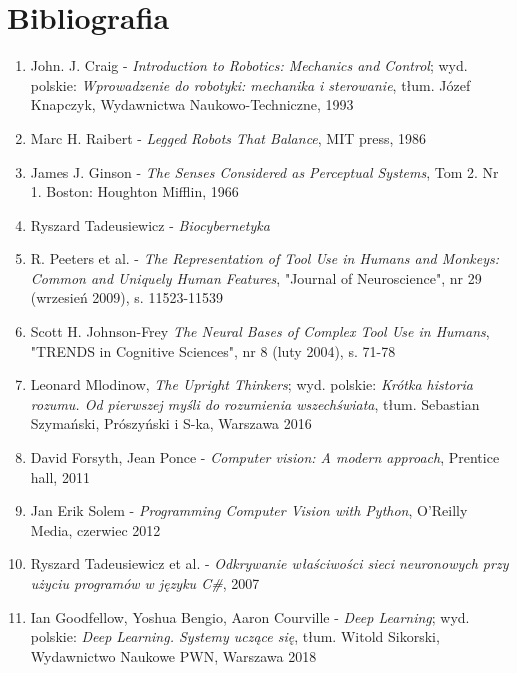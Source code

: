 \documentclass{article}
\begin{document}
\section*{\LARGE{Bibliografia}} 
\begin{enumerate}
\item John. J. Craig - \emph{Introduction to Robotics: Mechanics and Control}; wyd. polskie: \emph{Wprowadzenie do robotyki: mechanika i sterowanie}, tłum. Józef Knapczyk, Wydawnictwa Naukowo-Techniczne, 1993

\item Marc H. Raibert - \emph{Legged Robots That Balance}, MIT press, 1986

\item James J. Ginson - \emph{The Senses Considered as Perceptual Systems}, Tom 2. Nr 1. Boston: Houghton Mifflin, 1966

\item Ryszard Tadeusiewicz - \emph{Biocybernetyka}

\item R. Peeters et al. - \emph{The Representation of Tool Use in Humans and Monkeys: Common and Uniquely Human Features}, "Journal of Neuroscience", nr 29 (wrzesień 2009), s. 11523-11539

\item Scott H. Johnson-Frey \emph{The Neural Bases of Complex Tool Use in Humans}, "TRENDS in Cognitive Sciences", nr 8 (luty 2004), s. 71-78

\item  Leonard Mlodinow, \emph{The Upright Thinkers}; wyd. polskie: \emph{Krótka historia rozumu. Od pierwszej myśli do rozumienia wszechświata}, tłum. Sebastian Szymański, Prószyński i S-ka, Warszawa 2016

\item David Forsyth, Jean Ponce - \emph{Computer vision: A modern approach}, Prentice hall, 2011

\item Jan Erik Solem - \emph{Programming Computer Vision with Python},  O’Reilly Media, czerwiec 2012

\item Ryszard Tadeusiewicz et al. - \emph{Odkrywanie właściwości sieci neuronowych przy użyciu programów w języku C\#}, 2007

\item Ian Goodfellow, Yoshua Bengio, Aaron Courville - \emph{Deep Learning}; wyd. polskie: \emph{Deep Learning. Systemy uczące się}, tłum. Witold Sikorski, Wydawnictwo Naukowe PWN, Warszawa 2018


\end{enumerate}
\end{document}
